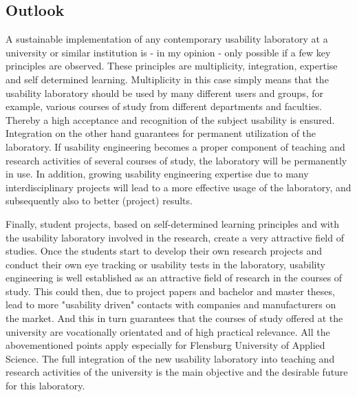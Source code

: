 \documentclass[output=paper]{langsci/langscibook}
\begin{document}
\subsection{Outlook}

A sustainable implementation of any contemporary usability laboratory at a university or similar institution is - in my opinion - only possible if a few key principles are observed. These principles are multiplicity, integration, expertise and self determined learning. Multiplicity in this case simply means that the usability laboratory should be used by many different users and groups, for example, various courses of study from different departments and faculties. Thereby a high acceptance and recognition of the subject usability is ensured. Integration on the other hand guarantees for permanent utilization of the laboratory. If usability engineering becomes a proper component of teaching and research activities of several courses of study, the laboratory will be permanently in use. In addition, growing usability engineering expertise due to many interdisciplinary projects will lead to a more effective usage of the laboratory, and subsequently also to better (project) results.


Finally, student projects, based on self-determined learning principles and with the usability laboratory involved in the research, create a very attractive field of studies. Once the students start to develop their own research projects and conduct their own eye tracking or usability tests in the laboratory, usability engineering is well established as an attractive field of research in the courses of study. This could then, due to project papers and bachelor and master theses, lead to more "usability driven" contacts with companies and manufacturers on the market. And this in turn guarantees that the courses of study offered at the university are vocationally orientated and of high practical relevance. All the abovementioned points apply especially for Flensburg University of Applied Science. The full integration of the new usability laboratory into teaching and research activities of the university is the main objective and the desirable future for this laboratory.
\end{document}
